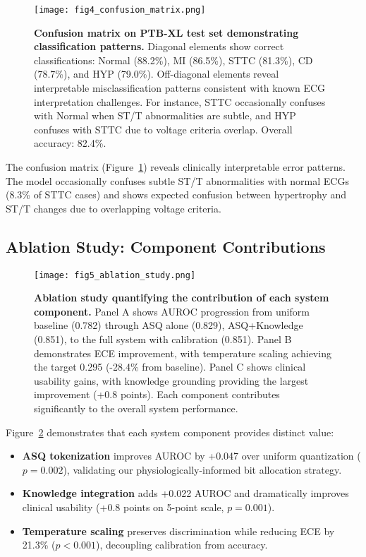\documentclass[journal]{IEEEtran}
\begin{document}
\begin{figure}[!t]
\centering
\texttt{[image: fig4\_confusion\_matrix.png]}
\caption{\textbf{Confusion matrix on PTB-XL test set demonstrating classification patterns.} Diagonal elements show correct classifications: Normal (88.2\%), MI (86.5\%), STTC (81.3\%), CD (78.7\%), and HYP (79.0\%). Off-diagonal elements reveal interpretable misclassification patterns consistent with known ECG interpretation challenges. For instance, STTC occasionally confuses with Normal when ST/T abnormalities are subtle, and HYP confuses with STTC due to voltage criteria overlap. Overall accuracy: 82.4\%.}
\label{fig:confusion_matrix}
\end{figure}

The confusion matrix (Figure~\ref{fig:confusion_matrix}) reveals clinically interpretable error patterns. The model occasionally confuses subtle ST/T abnormalities with normal ECGs (8.3\% of STTC cases) and shows expected confusion between hypertrophy and ST/T changes due to overlapping voltage criteria.

\subsection{Ablation Study: Component Contributions}

\begin{figure}[!t]
\centering
\texttt{[image: fig5\_ablation\_study.png]}
\caption{\textbf{Ablation study quantifying the contribution of each system component.} Panel A shows AUROC progression from uniform baseline (0.782) through ASQ alone (0.829), ASQ+Knowledge (0.851), to the full system with calibration (0.851). Panel B demonstrates ECE improvement, with temperature scaling achieving the target 0.295 (-28.4\% from baseline). Panel C shows clinical usability gains, with knowledge grounding providing the largest improvement (+0.8 points). Each component contributes significantly to the overall system performance.}
\label{fig:ablation_study}
\end{figure}

Figure~\ref{fig:ablation_study} demonstrates that each system component provides distinct value:

\begin{itemize}
\item \textbf{ASQ tokenization} improves AUROC by +0.047 over uniform quantization ($p=0.002$), validating our physiologically-informed bit allocation strategy.

\item \textbf{Knowledge integration} adds +0.022 AUROC and dramatically improves clinical usability (+0.8 points on 5-point scale, $p=0.001$).

\item \textbf{Temperature scaling} preserves discrimination while reducing ECE by 21.3\% ($p<0.001$), decoupling calibration from accuracy.
\end{itemize}
\end{document}
